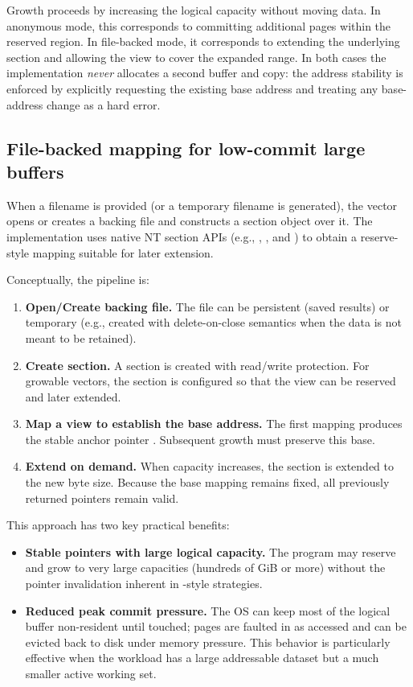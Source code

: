 Growth proceeds by increasing the logical capacity 
without moving data. In anonymous mode, this corresponds to committing
additional pages within the reserved region. In file-backed mode, it corresponds
to extending the underlying section and allowing the view to cover the expanded
range. In both cases the implementation \emph{never} allocates a second buffer and
copy: the address stability is enforced by explicitly requesting the existing
base address and treating any base-address change as a hard error.

\subsection{File-backed mapping for low-commit large buffers}
\label{sec:file_backed_mapping}

When a filename is provided (or a temporary filename is generated), the vector
opens or creates a backing file and constructs a section object over it. The implementation uses
native NT section APIs (e.g., ,
, and ) to obtain a
reserve-style mapping suitable for later extension.

Conceptually, the pipeline is:
\begin{enumerate}
  \item \textbf{Open/Create backing file.} The file can be persistent (saved
  results) or temporary (e.g., created with delete-on-close semantics when the
  data is not meant to be retained).
  \item \textbf{Create section.} A section is created with read/write
  protection. For growable vectors, the section is configured so that the view
  can be reserved and later extended.
  \item \textbf{Map a view to establish the base address.} The first mapping
  produces the stable anchor pointer . Subsequent growth must
  preserve this base.
  \item \textbf{Extend on demand.} When capacity increases, the section is
  extended to the new byte size. Because the base mapping remains fixed, all
  previously returned pointers remain valid.
\end{enumerate}

This approach has two key practical benefits:
\begin{itemize}
  \item \textbf{Stable pointers with large logical capacity.} The program may
  reserve and grow to very large capacities (hundreds of GiB or more) without
  the pointer invalidation inherent in -style strategies.
  \item \textbf{Reduced peak commit pressure.} The OS can keep most of the
  logical buffer non-resident until touched; pages are faulted in as accessed
  and can be evicted back to disk under memory pressure. This behavior is particularly
  effective when the workload has a large addressable dataset but a much smaller
  active working set.
\end{itemize}


